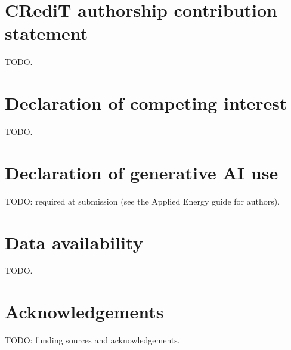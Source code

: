 \documentclass[5p,times,twocolumn]{elsarticle}
\begin{document}
\section*{CRediT authorship contribution statement}
TODO.

\section*{Declaration of competing interest}
TODO.

\section*{Declaration of generative AI use}
TODO: required at submission (see the Applied Energy guide for authors).

\section*{Data availability}
TODO.

\section*{Acknowledgements}
TODO: funding sources and acknowledgements.



\end{document}
